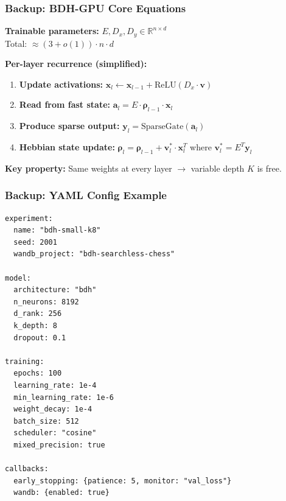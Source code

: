 \documentclass{beamer}
\begin{document}
\begin{frame}
\frametitle{Backup: BDH-GPU Core Equations}

\textbf{Trainable parameters:} $E, D_x, D_y \in \mathbb{R}^{n \times d}$\\
Total: $\approx (3 + o(1)) \cdot n \cdot d$

\vspace{1em}
\textbf{Per-layer recurrence (simplified):}

\begin{enumerate}
    \item \textbf{Update activations:}
    $\mathbf{x}_{l} \leftarrow \mathbf{x}_{l-1} + \text{ReLU}(D_x \cdot \mathbf{v})$
    
    \item \textbf{Read from fast state:}
    $\mathbf{a}_{l} = E \cdot \boldsymbol{\rho}_{l-1} \cdot \mathbf{x}_{l}$
    
    \item \textbf{Produce sparse output:}
    $\mathbf{y}_{l} = \text{SparseGate}(\mathbf{a}_{l})$
    
    \item \textbf{Hebbian state update:}
    $\boldsymbol{\rho}_{l} = \boldsymbol{\rho}_{l-1} + \mathbf{v}^*_{l} \cdot \mathbf{x}_{l}^T$
    \hfill where $\mathbf{v}^*_{l} = E^T \mathbf{y}_{l}$
\end{enumerate}

\vspace{0.5em}
\textbf{Key property:} Same weights at every layer $\rightarrow$ variable depth $K$ is free.

\end{frame}

\begin{frame}[fragile]
\frametitle{Backup: YAML Config Example}

{\footnotesize
\begin{verbatim}
experiment:
  name: "bdh-small-k8"
  seed: 2001
  wandb_project: "bdh-searchless-chess"

model:
  architecture: "bdh"
  n_neurons: 8192
  d_rank: 256
  k_depth: 8
  dropout: 0.1

training:
  epochs: 100
  learning_rate: 1e-4
  min_learning_rate: 1e-6
  weight_decay: 1e-4
  batch_size: 512
  scheduler: "cosine"
  mixed_precision: true

callbacks:
  early_stopping: {patience: 5, monitor: "val_loss"}
  wandb: {enabled: true}
\end{verbatim}
}

\end{frame}
\end{document}

